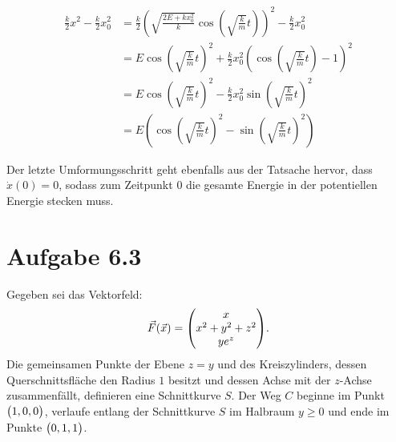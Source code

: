 \documentclass{theozettel}
\begin{document}
\begin{align}
\frac{k}{2}x^{2} - \frac{k}{2}x_0^{2} &= \frac{k}{2}\left(\sqrt{\frac{2 E + k x_0^{2}}{k}} \cos(\sqrt{\frac{k}{m}} t)\right)^{2} - \frac{k}{2}x_0^{2} \\
&= E \cos(\sqrt{\frac{k}{m}} t)^{2} + \frac{k}{2}x_0^{2} (\cos(\sqrt{\frac{k}{m}} t) - 1)^{2} \\
&= E \cos(\sqrt{\frac{k}{m}} t)^{2} - \frac{k}{2}x_0^{2} \sin(\sqrt{\frac{k}{m}} t)^{2}\\
&=  E \left( \cos(\sqrt{\frac{k}{m}} t)^{2} - \sin(\sqrt{\frac{k}{m}} t)^{2} \right)
\end{align}

Der letzte Umformungsschritt geht ebenfalls aus der Tatsache hervor, dass $\dot{x}(0) = 0$, sodass zum Zeitpunkt $0$ die gesamte Energie in der potentiellen Energie stecken muss.


\newpage
\section*{Aufgabe 6.3} 
Gegeben sei das Vektorfeld:
\[
	\vec{F}(\vec{x}) = \mqty(x \\ x^{2} + y^{2} + z^{2} \\ ye^{z}).
\]
Die gemeinsamen Punkte der Ebene $z=y$ und des Kreiszylinders, dessen Querschnittsfläche den Radius $1$ besitzt und dessen Achse mit der $z$-Achse zusammenfällt, definieren eine Schnittkurve $S$. Der Weg $C$ beginne im Punkt $\mqty(1, 0, 0)$, verlaufe entlang der Schnittkurve $S$ im Halbraum $y \geq 0$ und ende im Punkte $\mqty(0, 1, 1)$.
\end{document}
